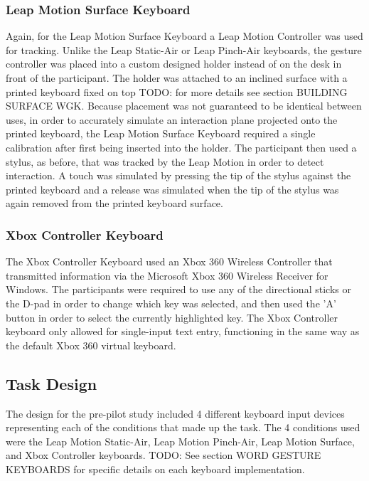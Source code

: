 \subsubsection{Leap Motion Surface Keyboard}

Again, for the Leap Motion Surface Keyboard a Leap Motion Controller was used for tracking. Unlike the Leap Static-Air or Leap Pinch-Air keyboards, the gesture controller was placed into a custom designed holder instead of on the desk in front of the participant. The holder was attached to an inclined surface with a printed keyboard fixed on top TODO: for more details see section BUILDING SURFACE WGK. Because placement was not guaranteed to be identical between uses, in order to accurately simulate an interaction plane projected onto the printed keyboard, the Leap Motion Surface Keyboard required a single calibration after first being inserted into the holder. The participant then used a stylus, as before, that was tracked by the Leap Motion in order to detect interaction. A touch was simulated by pressing the tip of the stylus against the printed keyboard and a release was simulated when the tip of the stylus was again removed from the printed keyboard surface.

\subsubsection{Xbox Controller Keyboard}

The Xbox Controller Keyboard used an Xbox 360 Wireless Controller that transmitted information via the Microsoft Xbox 360 Wireless Receiver for Windows. The participants were required to use any of the directional sticks or the D-pad in order to change which key was selected, and then used the 'A' button in order to select the currently highlighted key. The Xbox Controller keyboard only allowed for single-input text entry, functioning in the same way as the default Xbox 360 virtual keyboard. 

\subsection{Task Design} \label{pre_task}

The design for the pre-pilot study included 4 different keyboard input devices representing each of the conditions that made up the task. The 4 conditions used were the Leap Motion Static-Air, Leap Motion Pinch-Air, Leap Motion Surface, and Xbox Controller keyboards. TODO: See section WORD GESTURE KEYBOARDS for specific details on each keyboard implementation.

